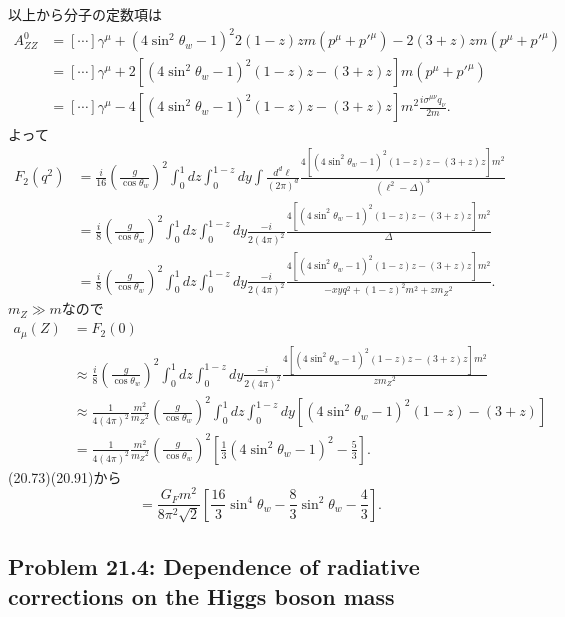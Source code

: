 以上から分子の定数項は
\begin{align*}
  A_{ZZ}^0 &= [\cdots] \gamma^\mu + (4\sin^2\theta_w-1)^2 2(1-z)zm(p^\mu+p'^\mu) - 2(3+z)zm(p^\mu+p'^\mu) \\
  &= [\cdots] \gamma^\mu + 2 \left[ (4\sin^2\theta_w-1)^2 (1-z)z - (3+z)z \right]m(p^\mu+p'^\mu) \\
  &= [\cdots] \gamma^\mu - 4 \left[ (4\sin^2\theta_w-1)^2 (1-z)z - (3+z)z \right] m^2 \frac{i\sigma^{\mu\nu}q_\nu}{2m} .
\end{align*}
よって
\begin{align*}
  F_2(q^2) &= \frac{i}{16} \left(\frac{g}{\cos\theta_w}\right)^2 \int_0^1 dz \int_0^{1-z} dy \int\frac{d^d\ell}{(2\pi)^d} \frac{4 \left[ (4\sin^2\theta_w-1)^2 (1-z)z - (3+z)z \right] m^2}{(\ell^2-\Delta)^3} \\
  &= \frac{i}{8} \left(\frac{g}{\cos\theta_w}\right)^2 \int_0^1 dz \int_0^{1-z} dy
  \frac{-i}{2(4\pi)^2} \frac{4 \left[ (4\sin^2\theta_w-1)^2 (1-z)z - (3+z)z \right] m^2}{\Delta} \\
  &= \frac{i}{8} \left(\frac{g}{\cos\theta_w}\right)^2 \int_0^1 dz \int_0^{1-z} dy
  \frac{-i}{2(4\pi)^2} \frac{4 \left[ (4\sin^2\theta_w-1)^2 (1-z)z - (3+z)z \right] m^2}{- xy q^2 + (1-z)^2m^2 + zm_Z{}^2} .
\end{align*}
\(m_Z \gg m\)なので
\begin{align*}
  a_\mu(Z) &= F_2(0) \\
  &\approx \frac{i}{8} \left(\frac{g}{\cos\theta_w}\right)^2 \int_0^1 dz \int_0^{1-z} dy
  \frac{-i}{2(4\pi)^2} \frac{4 \left[ (4\sin^2\theta_w-1)^2 (1-z)z - (3+z)z \right] m^2}{zm_Z{}^2} \\
  &\approx \frac{1}{4(4\pi)^2} \frac{m^2}{m_Z{}^2} \left(\frac{g}{\cos\theta_w}\right)^2
  \int_0^1 dz \int_0^{1-z} dy \left[ (4\sin^2\theta_w-1)^2 (1-z) - (3+z) \right] \\
  &= \frac{1}{4(4\pi)^2} \frac{m^2}{m_Z{}^2} \left(\frac{g}{\cos\theta_w}\right)^2
  \left[ \frac{1}{3} (4\sin^2\theta_w-1)^2 - \frac{5}{3} \right] .
\end{align*}
(20.73)(20.91)から
\[
= \frac{G_Fm^2}{8\pi^2\sqrt{2}} \left[ \frac{16}{3}\sin^4\theta_w - \frac{8}{3}\sin^2\theta_w - \frac{4}{3} \right] .
\]

\subsection[Problem 21.4]{Problem 21.4: Dependence of radiative corrections on the Higgs boson mass}
